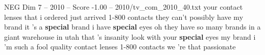 \begin{textsample}{NEG Dim 7 – 2010 – Score -1.00 – 2010/tv\_com\_2010\_40.txt}  \label{ex:f7_neg_020}
your contact lenses that i ordered just arrived 1-800 contacts they can't possibly have my brand it 's a \textbf{special} brand i have \textbf{special} eyes oh they have so many brands in a giant warehouse in utah that 's insanity look with your \textbf{special} eyes my brand i 'm such a fool quality contact lenses 1-800 contacts we 're that passionate

\end{textsample}
